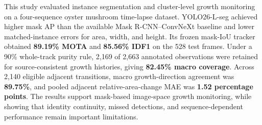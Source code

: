 \documentclass[11pt,a4paper]{article}
\begin{document}
This study evaluated instance segmentation and cluster-level growth monitoring on a four-sequence oyster mushroom time-lapse dataset. YOLO26-L-seg achieved higher mask AP than the available Mask R-CNN--ConvNeXt baseline and lower matched-instance errors for area, width, and height. Its frozen mask-IoU tracker obtained \textbf{89.19\% MOTA} and \textbf{85.56\% IDF1} on the 528 test frames. Under a 90\% whole-track purity rule, 2,169 of 2,663 annotated observations were retained for source-consistent growth histories, giving \textbf{82.45\% macro coverage}. Across 2,140 eligible adjacent transitions, macro growth-direction agreement was \textbf{89.75\%}, and pooled adjacent relative-area-change MAE was \textbf{1.52 percentage points}. The results support mask-based image-space growth monitoring, while showing that identity continuity, missed detections, and sequence-dependent performance remain important limitations.
\end{document}
